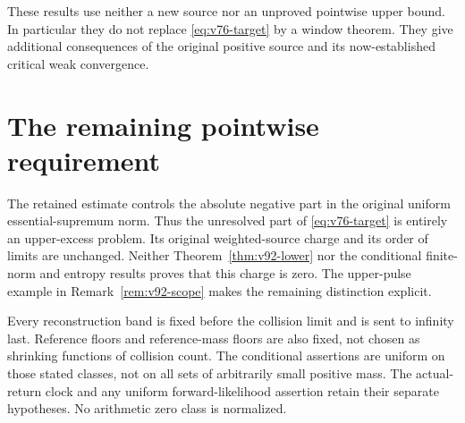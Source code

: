 \documentclass[11pt,reqno]{amsart}
\numberwithin{equation}{section}
\theoremstyle{definition}
\theoremstyle{remark}\newtheorem{remark}[theorem]{Remark}
\begin{document}
These results use neither a new source nor an unproved pointwise upper
bound. In particular they do not replace \eqref{eq:v76-target} by a
window theorem. They give additional consequences of the original
positive source and its now-established critical weak convergence.






\section{The remaining pointwise requirement}
The retained estimate controls the absolute negative part in the
original uniform essential-supremum norm. Thus the unresolved part of
\eqref{eq:v76-target} is entirely an upper-excess problem. Its original
weighted-source charge and its order of limits are unchanged. Neither
Theorem~\ref{thm:v92-lower} nor the conditional finite-norm and entropy
results proves that this charge is zero. The upper-pulse example in
Remark~\ref{rem:v92-scope} makes the remaining distinction explicit.

Every reconstruction band is fixed before the collision limit and is
sent to infinity last. Reference floors and reference-mass floors are
also fixed, not chosen as shrinking functions of collision count.
The conditional assertions are uniform on those stated classes, not on
all sets of arbitrarily small positive mass. The actual-return clock
and any uniform forward-likelihood assertion retain their separate
hypotheses. No arithmetic zero class is normalized.

\appendix


\end{document}

